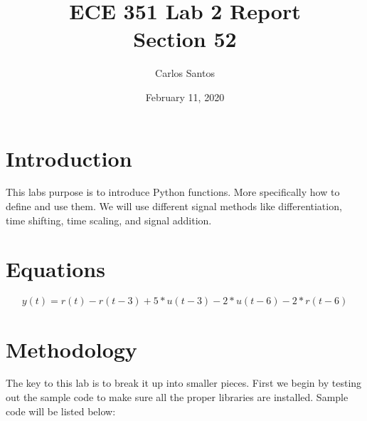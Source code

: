 \documentclass[12pt]{article}
\title{ECE 351 Lab 2 Report \\ Section 52}
\date{February 11, 2020}
\author{Carlos Santos}
\begin{document}
\vspace{\fill}
\maketitle
\vspace{\fill}
\clearpage

\section*{Introduction}

This labs purpose is to introduce Python functions. More specifically how to define and use them. We will use different signal methods like differentiation, time shifting, time scaling, and signal addition.

\section*{Equations}

\begin{equation}
    y(t) = r(t) - r(t-3) + 5*u(t-3) - 2*u(t-6) - 2*r(t-6)
\end{equation}

\section*{Methodology}

The key to this lab is to break it up into smaller pieces. First we begin by testing out the sample code to make sure all the proper libraries are installed. Sample code will be listed below: \\
\end{document}
